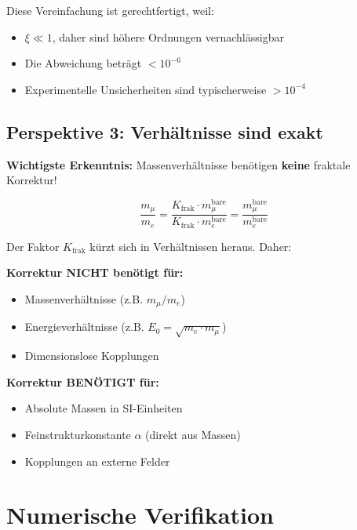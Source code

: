 	Diese Vereinfachung ist gerechtfertigt, weil:
	\begin{itemize}
		\item $\xi \ll 1$, daher sind höhere Ordnungen vernachlässigbar
		\item Die Abweichung beträgt $< 10^{-6}$
		\item Experimentelle Unsicherheiten sind typischerweise $> 10^{-4}$
	\end{itemize}
	
	\subsection{Perspektive 3: Verhältnisse sind exakt}
	
	\textbf{Wichtigste Erkenntnis:} Massenverhältnisse benötigen \textbf{keine} fraktale Korrektur!
	
	\begin{equation}
		\frac{m_\mu}{m_e} = \frac{K_{\text{frak}} \cdot m_\mu^{\text{bare}}}{K_{\text{frak}} \cdot m_e^{\text{bare}}} = \frac{m_\mu^{\text{bare}}}{m_e^{\text{bare}}}
		\label{eq:ratio_correction_free}
	\end{equation}
	
	Der Faktor $K_{\text{frak}}$ kürzt sich in Verhältnissen heraus. Daher:
	
	\begin{tcolorbox}[colback=green!5!white,colframe=green!75!black,title={Wann benötigt man $K_{\text{frak}}$?}]
		\textbf{Korrektur NICHT benötigt für:}
		\begin{itemize}
			\item Massenverhältnisse (z.B. $m_\mu/m_e$)
			\item Energieverhältnisse (z.B. $E_0 = \sqrt{m_e \cdot m_\mu}$)
			\item Dimensionslose Kopplungen
		\end{itemize}
		
		\textbf{Korrektur BENÖTIGT für:}
		\begin{itemize}
			\item Absolute Massen in SI-Einheiten
			\item Feinstrukturkonstante $\alpha$ (direkt aus Massen)
			\item Kopplungen an externe Felder
		\end{itemize}
	\end{tcolorbox}
	
	\section{Numerische Verifikation}
	
